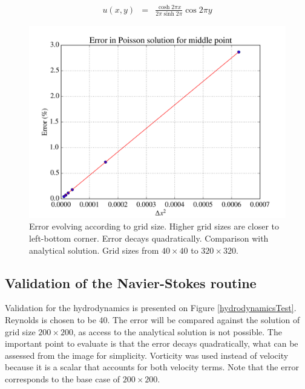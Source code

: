 \documentclass[journal]{IEEEtran}
\begin{document}
\begin{eqnarray}
u(x,y) & = & \frac{\cosh 2\pi x}{2\pi \sinh 2\pi}\cos 2 \pi y \label{solutionPoissonTest1}
\end{eqnarray}

\begin{figure}[!ht]
\centering
\includegraphics[width=\linewidth]{figures/validatePoissonP2}
\caption{Error evolving according to grid size. Higher grid sizes are closer to left-bottom corner. Error decays quadratically. Comparison with analytical solution. Grid sizes from $40\times 40$ to $320\times 320$. \label{errorPoissonTest}}
\end{figure}

\subsection{Validation of the Navier-Stokes routine}

Validation for the hydrodynamics is presented on Figure \ref{hydrodynamicsTest}. Reynolds is chosen to be 40. The error will be compared against the solution of grid size $200\times 200$, as access to the analytical solution is not possible. The important point to evaluate is that the error decays quadratically, what can be assessed from the image for simplicity. Vorticity was used instead of velocity because it is a scalar that accounts for both velocity terms. Note that the error corresponds to the base case of $200\times 200$.
\end{document}
